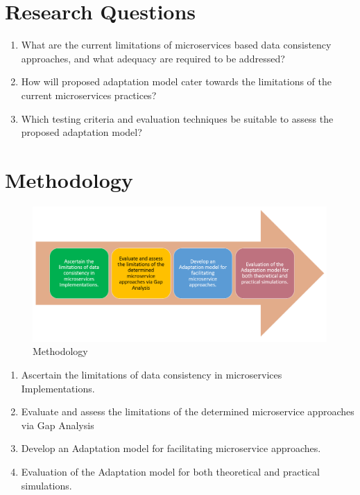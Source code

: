 \documentclass[a4paper,12pt]{article}
\begin{document}
\section{Research Questions}
\begin{enumerate}
\item	What are the current limitations of microservices based data consistency approaches, and what adequacy are required to be addressed?
\item	How will proposed adaptation model cater towards the limitations of the current microservices practices?
\item	Which testing criteria and evaluation techniques be suitable to assess the proposed adaptation model?
\end{enumerate}

\section{Methodology}
\begin{figure}[h!]
    \begin{center}
	    \includegraphics[width=\columnwidth]{img/methodology.png}
    \end{center}
	\caption{Methodology}
	\label{fig:microarch}
\end{figure}
\begin{enumerate}
\item	Ascertain the limitations of data consistency in microservices Implementations.
\item	Evaluate and assess the limitations of the determined microservice approaches via Gap Analysis
\item	Develop an Adaptation model for facilitating microservice approaches.
\item	Evaluation of the Adaptation model for both theoretical and practical simulations.
\end{enumerate}
\end{document}
